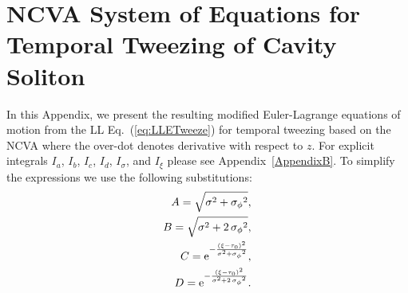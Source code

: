 \chapter{NCVA System of Equations for Temporal Tweezing of Cavity Soliton} %
\label{AppendixA} %

In this Appendix, we present the resulting modified Euler-Lagrange equations of motion from the LL Eq.~(\ref{eq:LLETweeze}) for temporal tweezing based on the NCVA where the over-dot denotes derivative with respect to $z$.  For explicit integrals $I_a$, $I_b$, $I_c$, $I_d$, $I_{\sigma}$, and $I_{\xi}$ please see Appendix~\ref{AppendixB}.  To simplify the expressions we use the following substitutions:
\begin{align}
A= \sqrt {{\sigma}^{2}+{{ \sigma_{\phi}}}^{2}}, \\
B= \sqrt {{\sigma}^{2}+2\,{{ \sigma_{\phi}}}^{2}},\\
C = {{\rm e}^{-{\frac { \left( { \xi}-{ \tau_0} \right) ^{2}}{{\sigma}^{2}+{{ \sigma_{\phi}}}^{2}}}}},\\
D = {{\rm e}^{-{\frac {\left( { \xi}-{ \tau_0} \right) ^{2}}{{\sigma}^{2}+2\,{{ \sigma_{\phi}}}^{2}}}}}.
\end{align}


